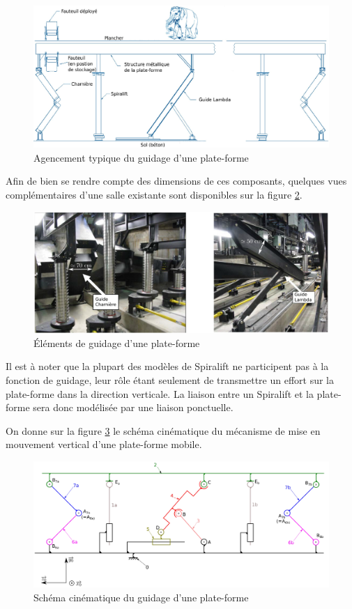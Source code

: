 \begin{figure}[!h]
 \centering\includegraphics[width=0.7\linewidth]{img/fig09}
 \caption{Agencement typique du guidage d'une plate-forme}
 \label{fig09}
\end{figure}

Afin de bien se rendre compte des dimensions de ces composants, quelques vues complémentaires
d'une salle existante sont disponibles sur la figure \ref{fig10}.

\begin{figure}[!h]
 \centering\includegraphics[width=0.7\linewidth]{img/fig10}
 \caption{Éléments de guidage d'une plate-forme}
 \label{fig10}
\end{figure}

Il est à noter que la plupart des modèles de Spiralift ne participent pas à la fonction de guidage, leur rôle étant seulement de transmettre un effort sur la plate-forme dans la direction verticale. La liaison entre un Spiralift et la plate-forme sera donc modélisée par une liaison ponctuelle.

On donne sur la figure \ref{fig11} le schéma cinématique du mécanisme de mise en mouvement vertical d'une plate-forme mobile.

\begin{figure}[!h]
 \centering\includegraphics[width=0.7\linewidth]{img/fig11}
 \caption{Schéma cinématique du guidage d'une plate-forme}
 \label{fig11}
\end{figure}

